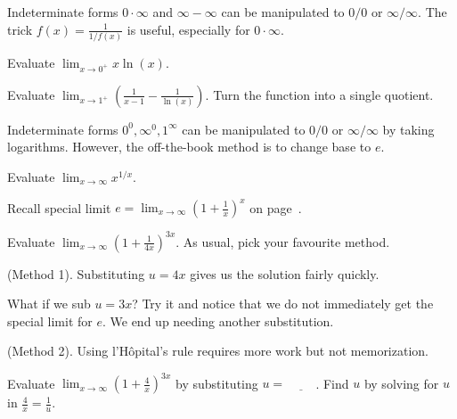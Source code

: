 \documentclass[../main.tex]{subfiles}
\begin{document}
\faStar{} Indeterminate forms \(0 \cdot \infty\) and \(\infty - \infty\) can be manipulated to \(0/0\) or \(\infty/\infty\).
The trick \(f(x) = \frac{1}{1/f(x)}\) is useful, especially for \(0 \cdot \infty\).

\begin{example} \label{eg:lhopital-x-ln-x}
  Evaluate \(\lim_{x \to 0^{+}} x \ln(x)\).

  \blanks*
\end{example}

\begin{exercise}
  Evaluate \(\lim_{x \to 1^{+}} \left(\frac{1}{x-1} - \frac{1}{\ln(x)}\right)\).  \hfill{\footnotesize Turn the function into a single quotient.}

  \blanks*
\end{exercise}
\clearpage

\faStar{} Indeterminate forms \(0^{0}, \infty^{0}, 1^{\infty}\) can be manipulated to \(0/0\) or \(\infty/\infty\) by taking logarithms.  However, the off-the-book method is to change base to \(e\).

\begin{example}
  Evaluate \(\lim_{x \to \infty} x^{1/x}\).

  \blanks*
\end{example}
\clearpage

\faStar{} Recall special limit \(e = \lim_{x \to \infty} \left( 1 + \frac{1}{x} \right)^{x}\) on page~\pageref{def:exp-ln}.

\begin{exercise}
  Evaluate \(\lim_{x \to \infty} \left(1 + \frac{1}{4x}\right)^{3x}\).
  As usual, pick your favourite method.

  (Method 1). Substituting \(u = 4x\) gives us the solution fairly quickly.


  What if we sub \(u = 3x\)? Try it and notice that we do not immediately get the special limit for \(e\). We end up needing another substitution.


  (Method 2). Using l'H\^opital's rule requires more work but not memorization.

\end{exercise}

\begin{exercise}
  Evaluate \(\lim_{x \to \infty} \left(1 + \frac{4}{x}\right)^{3x}\) by substituting \(u = \underline{\hspace{1cm}}\).  Find \(u\) by solving for \(u\) in \(\frac{4}{x} = \frac{1}{u}\).

\end{exercise}
\clearpage
\end{document}
